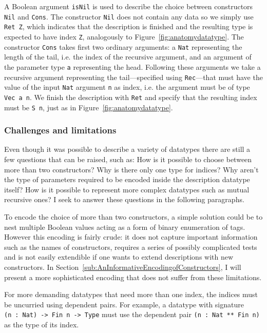 \documentclass{ituthesis}
\newcommand{\ttconstructor}[1]{\textcolor{constructor-color}{\texttt{#1}}}
\newcommand{\tttype}[1]{\textcolor{type-color}{\texttt{#1}}}
\newcommand{\ttvar}[1]{\textcolor{local-var-color}{\texttt{#1}}}
\theoremstyle{break}
\begin{document}
A Boolean argument \ttvar{isNil} is used to describe the choice between constructors \ttconstructor{Nil} and \ttconstructor{Cons}.
The constructor \ttconstructor{Nil} does not contain any data so we simply use \ttconstructor{Ret~Z}, which indicates that the description is finished and the resulting type is expected to have index \ttconstructor{Z}, analogously to Figure~\ref{fig:anatomydatatype}.
The constructor \ttconstructor{Cons} takes first two ordinary arguments: a \tttype{Nat} representing the length of the tail, i.e. the index of the recursive argument, and an argument of the parameter type \ttvar{a} representing the head.
Following these arguments we take a recursive argument representing the tail---specified using \ttconstructor{Rec}---that must have the value of the input \tttype{Nat} argument \ttvar{n} as index, i.e. the argument must be of type \tttype{Vec}~\ttvar{a~n}.
We finish the description with \ttconstructor{Ret} and specify that the resulting index must be \ttconstructor{S}~\ttvar{n}, just as in Figure~\ref{fig:anatomydatatype}.

\subsubsection{Challenges and limitations}
Even though it was possible to describe a variety of datatypes there are still a few questions that can be raised, such as: How is it possible to choose between more than two constructors? Why is there only one type for indices?
Why aren't the type of parameters required to be encoded inside the description datatype itself? How is it possible to represent more complex datatypes such as mutual recursive ones? I seek to answer these questions in the following paragraphs.

To encode the choice of more than two constructors, a simple solution could be to nest multiple Boolean values acting as a form of binary enumeration of tags.
However this encoding is fairly crude: it does not capture important information such as the names of constructors, requires a series of possibly complicated tests and is not easily extendible if one wants to extend descriptions
with new constructors. In Section~\ref{sub:AnInformativeEncodingofConstructors}, I will present a more sophisticated encoding that does not suffer from these limitations.

For more demanding datatypes that need more than one index, the indices must be uncurried using dependent pairs.
For example, a datatype with signature \texttt{(}\ttvar{n}~\texttt{:}~\tttype{Nat}\texttt{)~->~}\tttype{Fin}~\ttvar{n}~\texttt{->}~\tttype{Type} must use the dependent pair \tttype{(}\ttvar{n}~\texttt{:}~\tttype{Nat}~\tttype{**}~\tttype{Fin}~\ttvar{n}\tttype{)} as the type of its index.
\end{document}

